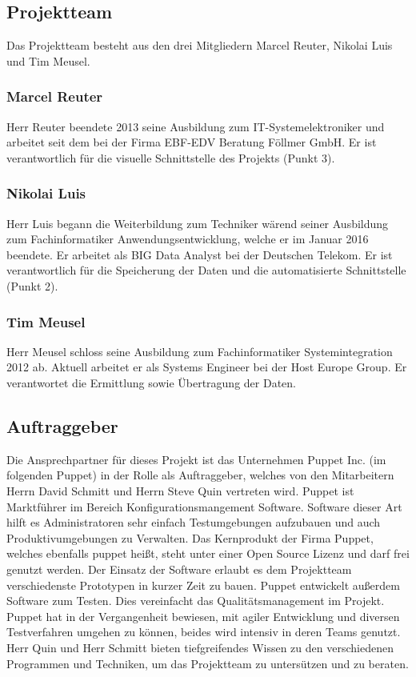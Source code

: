 \subsection{Projektteam}
Das Projektteam besteht aus den drei Mitgliedern Marcel Reuter, Nikolai Luis
und Tim Meusel.
\all%

\subsubsection{Marcel Reuter}
Herr Reuter beendete 2013 seine Ausbildung zum IT-Systemelektroniker und
arbeitet seit dem bei der Firma EBF-EDV Beratung Föllmer GmbH. Er ist
verantwortlich für die visuelle Schnittstelle des Projekts (Punkt 3).
\mr%

\subsubsection{Nikolai Luis}
Herr Luis begann die Weiterbildung zum Techniker wärend seiner Ausbildung zum
Fachinformatiker Anwendungsentwicklung, welche er im Januar 2016 beendete. Er
arbeitet als BIG Data Analyst bei der Deutschen Telekom. Er ist verantwortlich
für die Speicherung der Daten und die automatisierte Schnittstelle (Punkt 2).
\nl%

\subsubsection{Tim Meusel}
Herr Meusel schloss seine Ausbildung zum Fachinformatiker Systemintegration
2012 ab. Aktuell arbeitet er als Systems Engineer bei der Host Europe Group.
Er verantwortet die Ermittlung sowie Übertragung der Daten.
\tm%

\subsection{Auftraggeber}
Die Ansprechpartner für dieses Projekt ist das Unternehmen Puppet Inc. (im
folgenden Puppet) in der Rolle als Auftraggeber, welches von den Mitarbeitern
Herrn David Schmitt und Herrn Steve Quin vertreten wird. Puppet ist Marktführer
im Bereich Konfigurationsmangement Software. Software dieser Art hilft es
Administratoren sehr einfach Testumgebungen aufzubauen und auch
Produktivumgebungen zu Verwalten. Das Kernprodukt der Firma Puppet, welches
ebenfalls puppet heißt, steht unter einer Open Source Lizenz und darf frei
genutzt werden. Der Einsatz der Software erlaubt es dem Projektteam
verschiedenste Prototypen in kurzer Zeit zu bauen. Puppet entwickelt außerdem
Software zum Testen. Dies vereinfacht das Qualitätsmanagement im Projekt.
Puppet hat in der Vergangenheit bewiesen, mit agiler Entwicklung und diversen
Testverfahren umgehen zu können, beides wird intensiv in deren Teams genutzt.
Herr Quin und Herr Schmitt bieten tiefgreifendes Wissen zu den verschiedenen
Programmen und Techniken, um das Projektteam zu untersützen und zu beraten.
\all%

